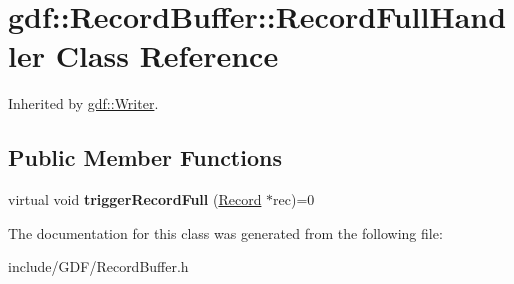 \hypertarget{classgdf_1_1_record_buffer_1_1_record_full_handler}{
\section{gdf::RecordBuffer::RecordFullHandler Class Reference}
\label{classgdf_1_1_record_buffer_1_1_record_full_handler}
}


Inherited by \hyperlink{classgdf_1_1_writer}{gdf::Writer}.

\subsection*{Public Member Functions}
\begin{DoxyCompactItemize}
\item 
\hypertarget{classgdf_1_1_record_buffer_1_1_record_full_handler_adf2e9f871aed8926a66a8fa52d1694b7}{
virtual void {\bfseries triggerRecordFull} (\hyperlink{classgdf_1_1_record}{Record} $\ast$rec)=0}
\label{classgdf_1_1_record_buffer_1_1_record_full_handler_adf2e9f871aed8926a66a8fa52d1694b7}

\end{DoxyCompactItemize}


The documentation for this class was generated from the following file:\begin{DoxyCompactItemize}
\item 
include/GDF/RecordBuffer.h\end{DoxyCompactItemize}

